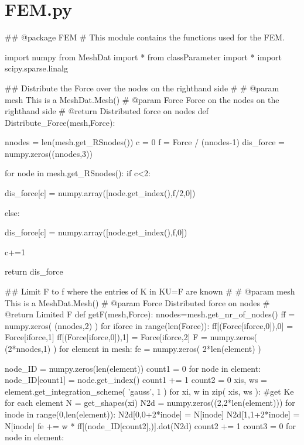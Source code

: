 \begin{appendices}
\begin{spverbatim}
\end{spverbatim}

\section{FEM.py}
\begin{spverbatim}
## @package FEM
#  This module contains the functions used for the FEM.

import numpy
from MeshDat import *
from classParameter import *
import scipy.sparse.linalg

## Distribute the Force over the nodes on the righthand side
#
#  @param  mesh This is a MeshDat.Mesh()
#  @param  Force Force on the nodes on the righthand side
#  @return       Distributed force on nodes
def Distribute_Force(mesh,Force):
    
    nnodes = len(mesh.get_RSnodes())
    c = 0
    f = Force / (nnodes-1)
    dis_force = numpy.zeros((nnodes,3))
    
    for node in mesh.get_RSnodes():
        if c<2:
        
            dis_force[c] = numpy.array([node.get_index(),f/2,0])
            
        else:
            
            dis_force[c] = numpy.array([node.get_index(),f,0])
        
        c+=1
        
    return dis_force

## Limit F to f where the entries of K in KU=F are known
#
#  @param  mesh This is a MeshDat.Mesh()
#  @param  Force Distributed force on nodes
#  @return       Limited F
def getF(mesh,Force):
    nnodes=mesh.get_nr_of_nodes()
    ff = numpy.zeros( (nnodes,2) )
    for iforce in range(len(Force)):
        ff[(Force[iforce,0]),0] = Force[iforce,1]
        ff[(Force[iforce,0]),1] = Force[iforce,2]
    F =  numpy.zeros( (2*nnodes,1) )
    for element in mesh:
         fe = numpy.zeros( 2*len(element) )

         node_ID = numpy.zeros(len(element))
         count1 = 0
         for node in element:
             node_ID[count1] = node.get_index()
             count1 += 1
         count2 = 0
         xis, ws = element.get_integration_scheme( 'gauss', 1 )
         for xi, w in zip( xis, ws ):                    #get Ke for each element
             N = get_shapes(xi)
             N2d = numpy.zeros((2,2*len(element)))
             for inode in range(0,len(element)):
                 N2d[0,0+2*inode] = N[inode]
                 N2d[1,1+2*inode] = N[inode]
             fe += w * ff[(node_ID[count2],)].dot(N2d)
             count2 += 1
         count3 = 0
         for node in element:


\end{spverbatim}
\end{appendices}
